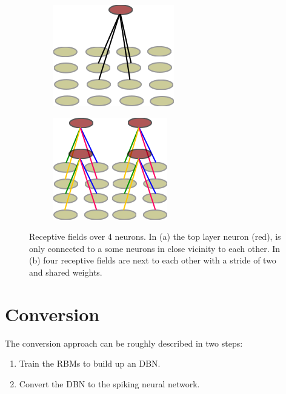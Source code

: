 \begin{figure}[h!]
	\centering
	\begin{subfigure}[t]{.4\textwidth}
  		\centering
  		\includegraphics[width=.5\linewidth]{imgs/recpt_field1.png}
  		\caption{}
  		\label{fig:receptfields1}
	\end{subfigure}%
	\begin{subfigure}[t]{.4\textwidth}
  		\centering
  		\includegraphics[width=.5\linewidth]{imgs/recpt_field2.png}
  		\caption{}
  		\label{fig:receptfields2}
	\end{subfigure}
	\caption[Receptive fields over 4 neurons.]{Receptive fields over 4 neurons. In (a) the top layer neuron (red), is only connected to a some neurons in close vicinity to each other. In (b) four receptive fields are next to each other with a stride of two and shared weights. }
	\label{fig:receptfields}
\end{figure}




\section{Conversion} \label{c:convappro}

The conversion approach can be roughly described in two steps:
\begin{enumerate}
\item Train the RBMs to build up an DBN.
\item Convert the DBN to the spiking neural network.
\end{enumerate}


